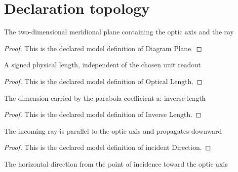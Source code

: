 \section{Declaration topology}
\begin{definition}
  \label{def:physics:phyx-mini-0114:phyxminiproblems-problemphyxmini0114-diagramplane}
  The two-dimensional meridional plane containing the optic axis and the ray
\end{definition}
\begin{proof}
  This is the declared model definition of Diagram Plane.
\end{proof}
\begin{definition}
  \label{def:physics:phyx-mini-0114:phyxminiproblems-problemphyxmini0114-opticallength}
  A signed physical length, independent of the chosen unit readout
\end{definition}
\begin{proof}
  This is the declared model definition of Optical Length.
\end{proof}
\begin{definition}
  \label{def:physics:phyx-mini-0114:phyxminiproblems-problemphyxmini0114-inverselength}
  The dimension carried by the parabola coefficient a: inverse length
\end{definition}
\begin{proof}
  This is the declared model definition of Inverse Length.
\end{proof}
\begin{definition}
  \label{def:physics:phyx-mini-0114:phyxminiproblems-problemphyxmini0114-incidentdirection}
  The incoming ray is parallel to the optic axis and propagates downward
\end{definition}
\begin{proof}
  This is the declared model definition of incident Direction.
\end{proof}
\begin{definition}
  \label{def:physics:phyx-mini-0114:phyxminiproblems-problemphyxmini0114-leftwarddirection}
  The horizontal direction from the point of incidence toward the optic axis
\end{definition}
